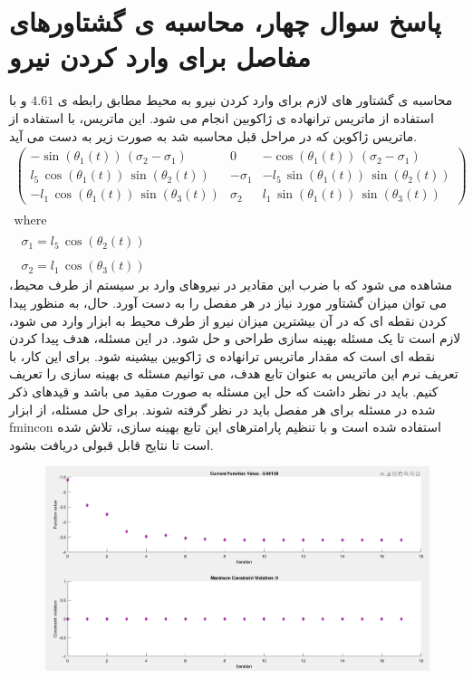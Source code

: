 \section*{پاسخ سوال چهار، محاسبه ی گشتاورهای مفاصل برای وارد کردن نیرو}
محاسبه ی گشتاور های لازم برای وارد کردن نیرو به محیط مطابق رابطه ی $4.61$ و با استفاده از ماتریس ترانهاده ی ژاکوبین انجام می شود. این ماتریس، با استفاده از ماتریس ژاکوین که در مراحل قبل محاسبه شد به صورت زیر به دست می آید.
\[
\begin{array}{l}
	\begin{pmatrix}
		-\sin \left(\theta_1 \left(t\right)\right)\,{\left(\sigma_2 -\sigma_1 \right)} & 0 & -\cos \left(\theta_1 \left(t\right)\right)\,{\left(\sigma_2 -\sigma_1 \right)} \\
		l_5 \,\cos \left(\theta_1 \left(t\right)\right)\,\sin \left(\theta_2 \left(t\right)\right) & -\sigma_1 & -l_5 \,\sin \left(\theta_1 \left(t\right)\right)\,\sin \left(\theta_2 \left(t\right)\right)  \\
		-l_1 \,\cos \left(\theta_1 \left(t\right)\right)\,\sin \left(\theta_3 \left(t\right)\right) & \sigma_2 & l_1 \,\sin \left(\theta_1 \left(t\right)\right)\,\sin \left(\theta_3 \left(t\right)\right)
	\end{pmatrix} \\
	\\
	\text{where} \\
	\\
	\;\;\sigma_1 = l_5 \,\cos \left(\theta_2 \left(t\right)\right) \\
	\\
	\;\;\sigma_2 = l_1 \,\cos \left(\theta_3 \left(t\right)\right)
\end{array}
\]
مشاهده می شود که با ضرب این مقادیر در نیروهای وارد بر سیستم از طرف محیط، می توان میزان گشتاور مورد نیاز در هر مفصل را به دست آورد. حال، به منظور پیدا کردن نقطه ای که در آن بیشترین میزان نیرو از طرف محیط به ابزار وارد می شود، لازم است تا یک مسئله بهینه سازی طراحی و حل شود. 
در این مسئله، هدف پیدا کردن نقطه ای است که مقدار ماتریس ترانهاده ی ژاکوبین بیشینه شود. برای این کار، با تعریف نرم این ماتریس به عنوان تابع هدف، می توانیم مسئله ی بهینه سازی را تعریف کنیم. 
باید در نظر داشت که حل این مسئله به صورت مقید می باشد و قیدهای ذکر شده در مسئله برای هر مفصل باید در نظر گرفته شوند.
برای حل مسئله، از ابزار fmincon استفاده شده است و با تنظیم پارامترهای این تابع بهینه سازی، تلاش شده است تا نتایج قابل قبولی دریافت بشود. 
\begin{figure}[htbp]
	\centering
	\includegraphics[width=0.7\linewidth]{../img/opt_process}
	\caption{}
	\label{fig:optprocess}
\end{figure}
